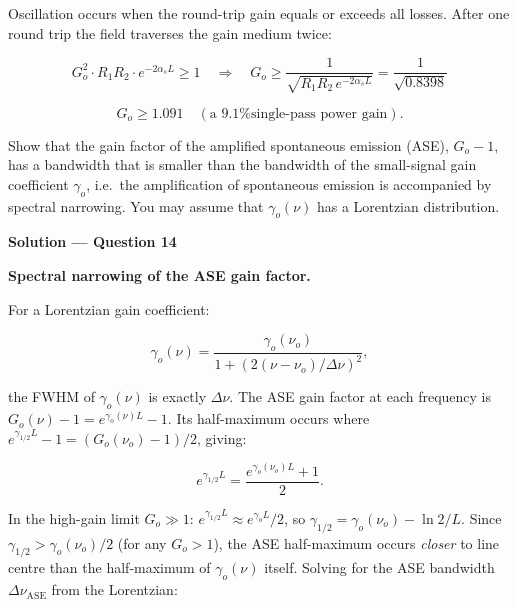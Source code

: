 Oscillation occurs when the round-trip gain equals or exceeds all losses. After one round trip the field traverses the gain medium twice:

\begin{equation*}
  G_o^2 \cdot R_1 R_2 \cdot e^{-2\alpha_s L} \ge 1
  \quad\Longrightarrow\quad G_o \ge \frac{1}{\sqrt{R_1 R_2\,e^{-2\alpha_s L}}} = \frac{1}{\sqrt{0.8398}}
\end{equation*}

\begin{equation*}
  \boxed{G_o \ge 1.091 \quad(\text{a 9.1\% single-pass power gain}).}
\end{equation*}


\begin{question}[Question 14]Show that the gain factor of the amplified spontaneous emission (ASE),
$G_{o}-1$, has a bandwidth that is smaller than the bandwidth of the small-signal gain
coefficient $\gamma_{o}$, i.e.\ the amplification of spontaneous emission is accompanied by
spectral narrowing. You may assume that $\gamma_{o}(\nu)$ has a Lorentzian distribution.
\end{question}

\textbf{\large Solution --- Question 14}

\textbf{Spectral narrowing of the ASE gain factor.}

For a Lorentzian gain coefficient:

\begin{equation*}
  \gamma_o(\nu) = \frac{\gamma_o(\nu_o)}{1+(2(\nu-\nu_o)/\Delta\nu)^2},
\end{equation*}

the FWHM of $\gamma_o(\nu)$ is exactly $\Delta\nu$. The ASE gain factor at each frequency is $G_o(\nu)-1 = e^{\gamma_o(\nu)L}-1$. Its half-maximum occurs where $e^{\gamma_{1/2}L}-1 = (G_o(\nu_o)-1)/2$, giving:

\begin{equation*}
  e^{\gamma_{1/2}L} = \frac{e^{\gamma_o(\nu_o)L}+1}{2}.
\end{equation*}

In the high-gain limit $G_o \gg 1$: $e^{\gamma_{1/2}L} \approx e^{\gamma_o L}/2$, so $\gamma_{1/2} = \gamma_o(\nu_o) - \ln2/L$. Since $\gamma_{1/2} > \gamma_o(\nu_o)/2$ (for any $G_o > 1$), the ASE half-maximum occurs \emph{closer} to line centre than the half-maximum of $\gamma_o(\nu)$ itself. Solving for the ASE bandwidth $\Delta\nu_{\text{ASE}}$ from the Lorentzian:

